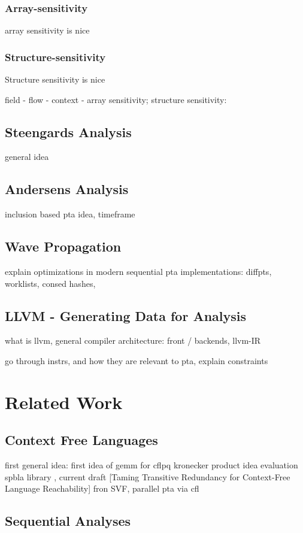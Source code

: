 \subsubsection{Array-sensitivity}
array sensitivity is nice
\subsubsection{Structure-sensitivity}
Structure sensitivity is nice

field - flow - context - array sensitivity; structure sensitivity: \autocite{balatsouras2016structure}
\subsection{Steengards Analysis}
general idea
\subsection{Andersens Analysis}
inclusion based pta idea, timeframe
\subsection{Wave Propagation}
explain optimizations in modern sequential pta implementations: diffpts, worklists, consed hashes, \autocite{pereirawave}
\subsection{LLVM - Generating Data for Analysis}
what is llvm, general compiler architecture: front / backends, llvm-IR

go through instrs, and how they are relevant to pta, explain constraints \autocite{lin2015alias}
\section{Related Work}
\subsection{Context Free Languages}
first general idea: \autocite{reps1998program} first idea of gemm for cflpq \autocite{azimov2018context} kronecker product idea \autocite{orachev2020context} evaluation \autocite{mishin2019evaluation} spbla library \autocite{orachev2021spbla}, current draft [Taming Transitive Redundancy for Context-Free Language Reachability] fron SVF, parallel pta via cfl \autocite{su2014parallel}
\subsection{Sequential Analyses}
